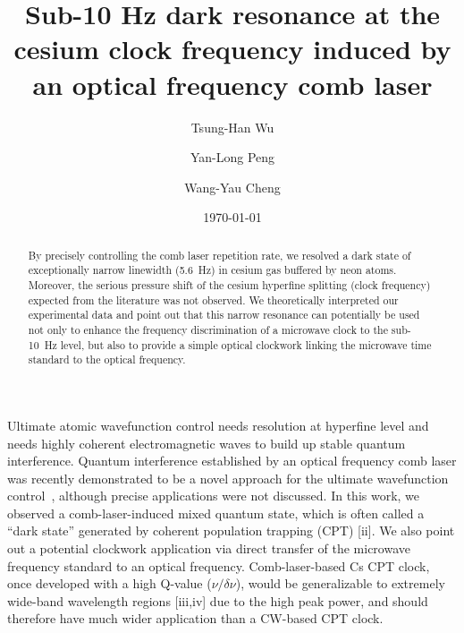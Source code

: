 \documentclass[%
reprint,  
aps,
prl,
showpacs,
preprint,
]{revtex4}
\begin{document}
\title{Sub-10 Hz dark resonance at the cesium clock frequency induced by an optical frequency comb laser}

\author{Tsung-Han Wu}
\author{Yan-Long Peng}
\author{Wang-Yau Cheng}


\date{\today}

\begin{abstract}
By precisely controlling the comb laser repetition rate, we
resolved a dark state of exceptionally narrow linewidth (5.6~Hz)
in cesium gas buffered by neon atoms. Moreover, the serious
pressure shift of the cesium hyperfine splitting (clock frequency)
expected from the literature was not observed. We theoretically
interpreted our experimental data and point out that this narrow
resonance can potentially be used not only to enhance the frequency 
discrimination of a microwave clock to the sub-10~Hz level, but also to
provide a simple optical clockwork linking the microwave time standard
to the optical frequency.
\end{abstract}



\maketitle
\narrowtext
Ultimate atomic wavefunction control needs resolution at hyperfine
level and needs highly coherent electromagnetic waves to build up 
stable quantum interference. Quantum interference established by an 
optical frequency comb laser was recently demonstrated to be a novel 
approach for the ultimate wavefunction control~\cite{Stowe2008}, 
although precise applications were not discussed. In this work, 
we observed a comb-laser-induced mixed quantum state, which is 
often called a ``dark state'' generated by coherent population 
trapping (CPT) [ii]. We also point out a potential clockwork application 
via direct transfer of the microwave frequency standard to an optical 
frequency. Comb-laser-based Cs CPT clock, once developed with a high 
Q-value ($\nu/\delta\nu$), would be generalizable to extremely wide-band
wavelength regions [iii,iv] due to the high peak power, and should therefore 
have much wider application than a CW-based CPT clock.
    
\end{document}

